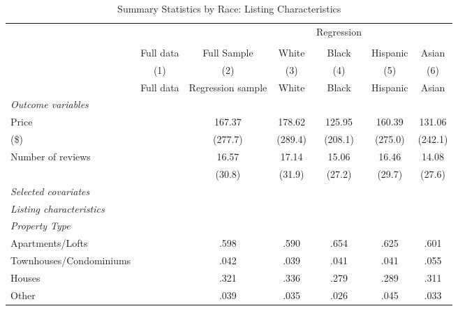 {
\def\sym#1{\ifmmode^{#1}\else\(^{#1}\)\fi}
\begin{longtable}{l*{6}{c}}
\caption{Summary Statistics by Race: Listing Characteristics}\\
\hline
                  &\multicolumn{1}{c}{}&\multicolumn{1}{c}{}&\multicolumn{1}{c}{}&\multicolumn{1}{c}{Regression}&\multicolumn{1}{c}{}&\multicolumn{1}{c}{}\\
                  		\cline{3-7}\\
                  &\multicolumn{1}{c}{Full data}&\multicolumn{1}{c}{Full Sample}&\multicolumn{1}{c}{White}&\multicolumn{1}{c}{Black}&\multicolumn{1}{c}{Hispanic}&\multicolumn{1}{c}{Asian}\\
                  
                  \hline\hline\endfirsthead\hline\endhead\hline\endfoot\endlastfoot
                  &\multicolumn{1}{c}{(1)}&\multicolumn{1}{c}{(2)}&\multicolumn{1}{c}{(3)}&\multicolumn{1}{c}{(4)}&\multicolumn{1}{c}{(5)}&\multicolumn{1}{c}{(6)}\\
                  &\multicolumn{1}{c}{Full data}&\multicolumn{1}{c}{Regression sample}&\multicolumn{1}{c}{White}&\multicolumn{1}{c}{Black}&\multicolumn{1}{c}{Hispanic}&\multicolumn{1}{c}{Asian}\\
\hline
\endhead                  
\textit{Outcome variables} \\
\hline
Price         &  &           167.37         &           178.62         &           125.95         &           160.39       &   131.06\\
(\$)                  &  &         (277.7)         &         (289.4)         &         (208.1)         &         (275.0)     & (242.1)    \\
[1em]
Number of reviews     &   &      16.57  &      17.14         &      15.06&      16.46 & 	14.08\\
                 &   &     (30.8)         &     (31.9)         &     (27.2)         &     (29.7)        & (27.6) \\
[1em]
\textit{Selected covariates} \\
\hline\hline
\textit{Listing characteristics} \\
\hline
\textit{Property Type} \\
Apartments/Lofts     		&	&      .598         &       .590         &      .654        &      .625 			& 	.601         \\
Townhouses/Condominiums   &  &      .042         &      .039         &      .041        &      .041 	& 		.055         \\
Houses    				&	&      .321         &       .336        &      .279        &      .289				& 		.311         \\
Other    				&	&      .039      &       .035        &      .026        &      .045	& 		.033        \\
[1em]


\end{longtable}}
